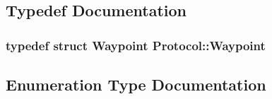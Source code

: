 \subsection{Typedef Documentation}
\hypertarget{namespace_protocol_a5a64ef0b3c8cee827111b106b3aaf25a}{}
\subsubsection[{Waypoint}]{\setlength{\rightskip}{0pt plus 5cm}typedef struct {\bf Waypoint} {\bf Protocol\+::\+Waypoint}}\label{namespace_protocol_a5a64ef0b3c8cee827111b106b3aaf25a}


\subsection{Enumeration Type Documentation}
\hypertarget{namespace_protocol_a95f2e35dc2d8d920f0d7ddaaf122c3b9}{}
